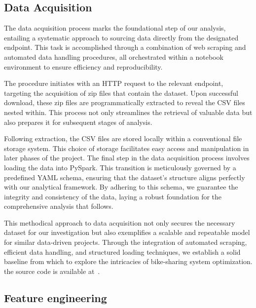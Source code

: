     \subsection{Data Acquisition}\label{subsec:data-acquisition}

    The data acquisition process marks the foundational step of our analysis, entailing a systematic approach to sourcing data directly from the designated endpoint.
    This task is accomplished through a combination of web scraping and automated data handling procedures, all orchestrated within a notebook environment to ensure efficiency and reproducibility.

    The procedure initiates with an HTTP request to the relevant endpoint, targeting the acquisition of zip files that contain the dataset.
    Upon successful download, these zip files are programmatically extracted to reveal the CSV files nested within.
    This process not only streamlines the retrieval of valuable data but also prepares it for subsequent stages of analysis.

    Following extraction, the CSV files are stored locally within a conventional file storage system.
    This choice of storage facilitates easy access and manipulation in later phases of the project.
    The final step in the data acquisition process involves loading the data into PySpark.
    This transition is meticulously governed by a predefined YAML schema, ensuring that the dataset's structure aligns perfectly with our analytical framework.
    By adhering to this schema, we guarantee the integrity and consistency of the data, laying a robust foundation for the comprehensive analysis that follows.

    This methodical approach to data acquisition not only secures the necessary dataset for our investigation but also exemplifies a scalable and repeatable model for similar data-driven projects.
    Through the integration of automated scraping, efficient data handling, and structured loading techniques, we establish a solid baseline from which to explore the intricacies of bike-sharing system optimization.
    the source code is available at~\cite{TechProjectSourceCode}.

    \subsection{Feature engineering}\label{subsec:feature-engineering}

